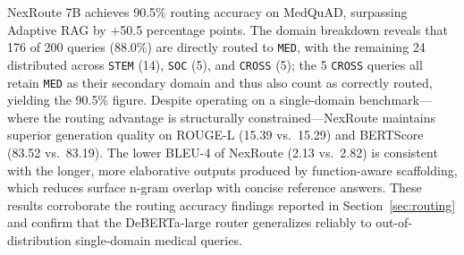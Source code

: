 \documentclass[a4paper,fleql]{cas-sc}
\begin{document}
NexRoute 7B achieves 90.5\% routing accuracy on MedQuAD, surpassing Adaptive RAG by $+$50.5 percentage points. The domain breakdown reveals that 176 of 200 queries (88.0\%) are directly routed to \texttt{MED}, with the remaining 24 distributed across \texttt{STEM} (14), \texttt{SOC} (5), and \texttt{CROSS} (5); the 5 \texttt{CROSS} queries all retain \texttt{MED} as their secondary domain and thus also count as correctly routed, yielding the 90.5\% figure. Despite operating on a single-domain benchmark---where the routing advantage is structurally constrained---NexRoute maintains superior generation quality on ROUGE-L (15.39 vs.\ 15.29) and BERTScore (83.52 vs.\ 83.19). The lower BLEU-4 of NexRoute (2.13 vs.\ 2.82) is consistent with the longer, more elaborative outputs produced by function-aware scaffolding, which reduces surface n-gram overlap with concise reference answers. These results corroborate the routing accuracy findings reported in Section~\ref{sec:routing} and confirm that the DeBERTa-large router generalizes reliably to out-of-distribution single-domain medical queries.
\end{document}

